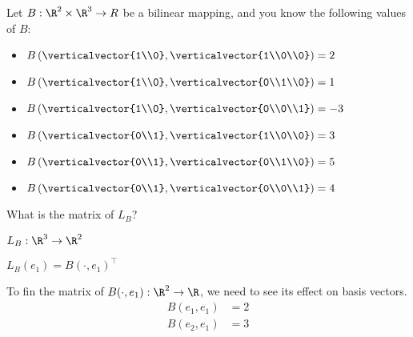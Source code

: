 \documentclass{ximera}
\begin{document}
	\begin{question}
		Let  $B:\R^2 \times \R^3 \to R$ be a bilinear mapping, and you know the following values of $B$:
			\begin{itemize}
				\item $B\left(\verticalvector{1\\0},\verticalvector{1\\0\\0}\right) = 2$
				\item $B\left(\verticalvector{1\\0},\verticalvector{0\\1\\0}\right) = 1$
				\item $B\left(\verticalvector{1\\0},\verticalvector{0\\0\\1}\right) = -3$
				\item $B\left(\verticalvector{0\\1},\verticalvector{1\\0\\0}\right) = 3$
				\item $B\left(\verticalvector{0\\1},\verticalvector{0\\1\\0}\right) = 5$
				\item $B\left(\verticalvector{0\\1},\verticalvector{0\\0\\1}\right) = 4$ 
			\end{itemize}
			
			What is the matrix of $L_B$?
			
			\begin{solution}
				\begin{hint}
					$L_B:\R^3 \to \R^2$
				\end{hint}
				\begin{hint}
					$L_B(e_1) = B(\cdot, e_1)^\top$
				\end{hint}
				\begin{hint}
					To fin the matrix of $B(\cdot,e_1):\R^2 \to \R$, we need to see its effect on basis vectors.
					\begin{align*}
						B(e_1,e_1) &= 2\\
						B(e_2,e_1) &=3
					\end{align*}
					

\end{hint}
\end{solution}
\end{question}
\end{document}
